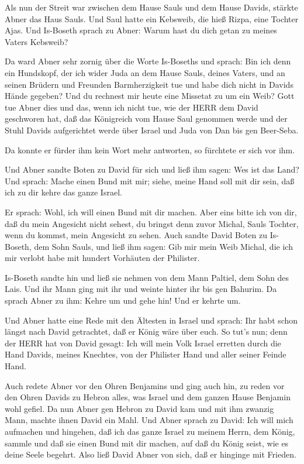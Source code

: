 Als nun der Streit war zwischen dem Hause Sauls und dem
Hause Davids, stärkte Abner das Haus Sauls.  Und Saul hatte
ein Kebsweib, die hieß Rizpa, eine Tochter Ajas. Und Is-Boseth sprach zu
Abner: Warum hast du dich getan zu meines Vaters Kebsweib?

 Da ward Abner sehr zornig über die Worte Is-Boseths und
sprach: Bin ich denn ein Hundskopf, der ich wider Juda an dem Hause
Sauls, deines Vaters, und an seinen Brüdern und Freunden Barmherzigkeit
tue und habe dich nicht in Davids Hände gegeben? Und du rechnest mir
heute eine Missetat zu um ein Weib?  Gott tue Abner dies und
das, wenn ich nicht tue, wie der HERR dem David geschworen hat,
 daß das Königreich vom Hause Saul genommen werde und der
Stuhl Davids aufgerichtet werde über Israel und Juda von Dan bis gen
Beer-Seba.

 Da konnte er fürder ihm kein Wort mehr antworten, so
fürchtete er sich vor ihm.

 Und Abner sandte Boten zu David für sich und ließ ihm
sagen: Wes ist das Land? Und sprach: Mache einen Bund mit mir; siehe,
meine Hand soll mit dir sein, daß ich zu dir kehre das ganze Israel.

 Er sprach: Wohl, ich will einen Bund mit dir machen. Aber
eins bitte ich von dir, daß du mein Angesicht nicht sehest, du bringst
denn zuvor Michal, Sauls Tochter, wenn du kommst, mein Angesicht zu
sehen.  Auch sandte David Boten zu Is-Boseth, dem Sohn
Sauls, und ließ ihm sagen: Gib mir mein Weib Michal, die ich mir verlobt
habe mit hundert Vorhäuten der Philister.

 Is-Boseth sandte hin und ließ sie nehmen von dem Mann
Paltiel, dem Sohn des Lais.  Und ihr Mann ging mit ihr und
weinte hinter ihr bis gen Bahurim. Da sprach Abner zu ihm: Kehre um und
gehe hin! Und er kehrte um.

 Und Abner hatte eine Rede mit den Ältesten in Israel und
sprach: Ihr habt schon längst nach David getrachtet, daß er König wäre
über euch.  So tut's nun; denn der HERR hat von David
gesagt: Ich will mein Volk Israel erretten durch die Hand Davids, meines
Knechtes, von der Philister Hand und aller seiner Feinde Hand.

 Auch redete Abner vor den Ohren Benjamins und ging auch
hin, zu reden vor den Ohren Davids zu Hebron alles, was Israel und dem
ganzen Hause Benjamin wohl gefiel.  Da nun Abner gen Hebron
zu David kam und mit ihm zwanzig Mann, machte ihnen David ein Mahl.
 Und Abner sprach zu David: Ich will mich aufmachen und
hingehen, daß ich das ganze Israel zu meinem Herrn, dem König, sammle
und daß sie einen Bund mit dir machen, auf daß du König seist, wie es
deine Seele begehrt. Also ließ David Abner von sich, daß er hinginge mit
Frieden.


